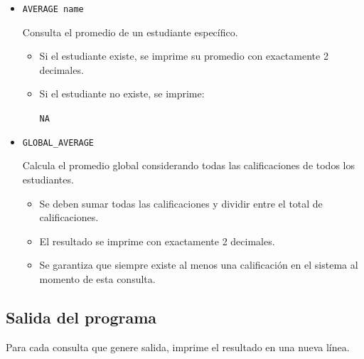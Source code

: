 \documentclass[11pt,a4paper]{article}
\begin{document}
\begin{itemize}
\begin{itemize}
    \item Se deben imprimir exactamente $k$ estudiantes o todos los existentes si hay menos de $k$.
    \item Cada estudiante se imprime en una línea en el formato:
    
    \texttt{name average}
    
    \item El promedio debe mostrarse con exactamente 2 decimales.
\end{itemize}

\vspace{0.3cm}

\item \texttt{AVERAGE name}

Consulta el promedio de un estudiante específico.

\begin{itemize}
    \item Si el estudiante existe, se imprime su promedio con exactamente 2 decimales.
    \item Si el estudiante no existe, se imprime:
    
    \texttt{NA}
\end{itemize}

\vspace{0.3cm}

\item \texttt{GLOBAL\_AVERAGE}

Calcula el promedio global considerando todas las calificaciones de todos los estudiantes.

\begin{itemize}
    \item Se deben sumar todas las calificaciones y dividir entre el total de calificaciones.
    \item El resultado se imprime con exactamente 2 decimales.
    \item Se garantiza que siempre existe al menos una calificación en el sistema al momento de esta consulta.
\end{itemize}

\end{itemize}

\subsection*{Salida del programa}

Para cada consulta que genere salida, imprime el resultado en una nueva línea.
\end{document}

